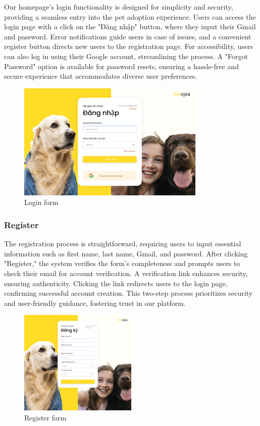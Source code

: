 Our homepage's login functionality is designed for simplicity and security, providing a seamless entry into the pet adoption experience. Users can access the login page with a click on the "Đăng nhập" button, where they input their Gmail and password. Error notifications guide users in case of issues, and a convenient register button directs new users to the registration page. For accessibility, users can also log in using their Google account, streamlining the process. A "Forgot Password" option is available for password resets, ensuring a hassle-free and secure experience that accommodates diverse user preferences.

\begin{figure}[H]
    \centering
    \includegraphics[width=0.8\textwidth]{Figures/login_ui.png}
    \caption{Login form}
\end{figure}

\subsubsection{Register}

The registration process is straightforward, requiring users to input essential information such as first name, last name, Gmail, and password. After clicking "Register," the system verifies the form's completeness and prompts users to check their email for account verification. A verification link enhances security, ensuring authenticity. Clicking the link redirects users to the login page, confirming successful account creation. This two-step process prioritizes security and user-friendly guidance, fostering trust in our platform.

\begin{figure}[H]
    \centering
    \includegraphics[width=0.5\textwidth]{Figures/register_ui.png}
    \caption{Register form}
\end{figure}

